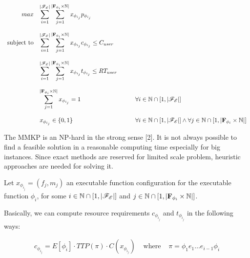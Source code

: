 \begin{equation}
	\begin{array} {rll} 
		\displaystyle max & \displaystyle \sum_{i = 1}^{|\mathscr{F_E}|}  \sum_{j = 1}^{|\textbf{F}_{\phi_{i}} \times \mathbb{N}|} x_{\phi_{i_{j}}} p_{\phi_{i_{j}}} \\\\
		
		\text{subject to} & \displaystyle \sum_{i = 1}^{|\mathscr{F_E}|}  \sum_{j = 1}^{|\textbf{F}_{\phi_{i}} \times \mathbb{N}|} x_{\phi_{i_{j}}} c_{\phi_{i_{j}}} \leq C_{user} \\\\
		
		& \displaystyle \sum_{i = 1}^{|\mathscr{F_E}|}  \sum_{j = 1}^{|\textbf{F}_{\phi_{i}} \times \mathbb{N}|} x_{\phi_{i_{j}}} t_{\phi_{i_{j}}} \leq RT_{user} \\\\       
		       
		& \displaystyle \sum_{j = 1}^{|\textbf{F}_{\phi_{i}} \times \mathbb{N}|} x_{\phi_{i_{j}}} = 1 & \qquad \forall i \in \mathbb{N} \cap \left[ 1, |\mathscr{F_E}| \right] \\\\
		
		& x_{\phi_{i_{j}}} \in \lbrace 0, 1 \rbrace & \qquad \forall i \in \mathbb{N} \cap \left[ 1, |\mathscr{F_E}| \right] \wedge \forall j \in \mathbb{N} \cap [1,|\textbf{F}_{\phi_{i}} \times \mathbb{N}|]
	\end{array}
\end{equation}


The MMKP is an NP-hard in the strong sense [2]. It is not
always possible to find a feasible solution in a reasonable
computing time especially for big instances. Since exact
methods are reserved for limited scale problem, heuristic
approaches are needed for solving it. 



Let $x_{\phi_{i_{j}}} = (f_j, m_j) $ an executable function configuration for the executable function $\phi_i$, for some $i \in \mathbb{N} \cap [1,|\mathscr{F_E}|]$ and $j \in \mathbb{N} \cap [1,|\textbf{F}_{\phi_{i}} \times \mathbb{N}|]$.

Basically, we can compute resource requirements $c_{\phi_{i_{j}}}$ and $t_{\phi_{i_{j}}}$ in the following ways:

\begin{eqnarray}
	c_{\phi_{i_{j}}} = E[\phi_i] \cdot TTP(\pi) \cdot C(x_{\phi_{i_{j}}}) & \text{ where } & \pi = \phi_1 e_1 \ldots e_{i-1} \phi_i
\end{eqnarray}






\newpage




